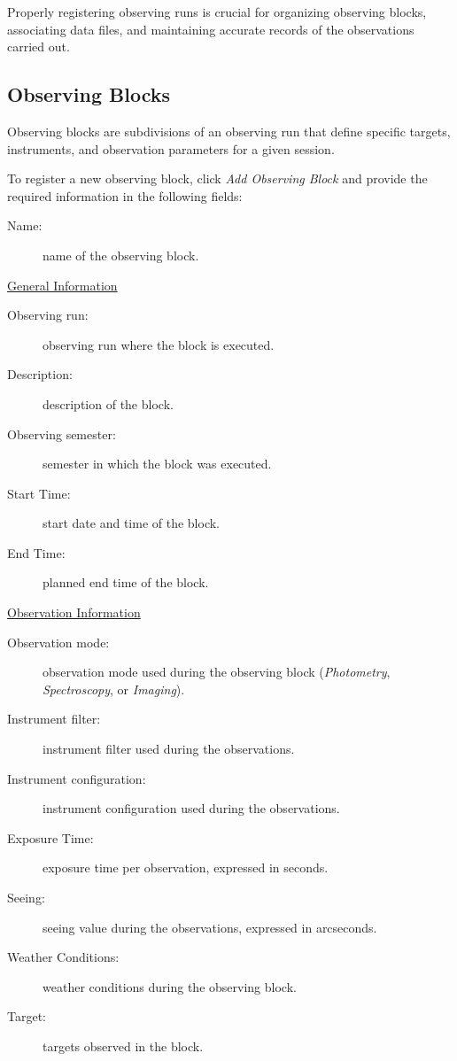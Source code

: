 
Properly registering observing runs is crucial for organizing observing blocks, associating data files, and maintaining accurate records of the observations carried out.


\subsection{Observing Blocks}

Observing blocks are subdivisions of an observing run that define specific targets, instruments, and observation parameters for a given session. 

To register a new observing block, click \textsl{Add Observing Block} and provide the required information in the following fields: 

\begin{description}
	\item[Name:] name of the observing block.
\end{description}


\underline{General Information}

\begin{description}
	\item[Observing run:] observing run where the block is executed.
	\item[Description:] description of the block.
	\item[Observing semester:] semester in which the block was executed.
	\item[Start Time:] start date and time of the block.
	\item[End Time:] planned end time of the block.
\end{description}


\underline{Observation Information}

\begin{description}
	\item[Observation mode:] observation mode used during the observing block (\textsl{Photometry}, \textsl{Spectroscopy}, or \textsl{Imaging}).
	\item[Instrument filter:] instrument filter used during the observations.
	\item[Instrument configuration:] instrument configuration used during the observations.
	\item[Exposure Time:] exposure time per observation, expressed in seconds.
	\item[Seeing:] seeing value during the observations, expressed in arcseconds.
	\item[Weather Conditions:] weather conditions during the observing block.
	\item[Target:] targets observed in the block.
\end{description}

